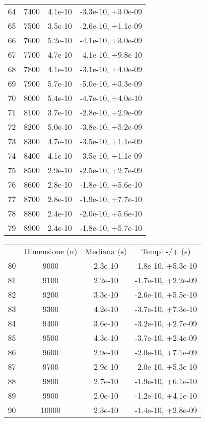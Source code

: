 \begin{table}
\begin{adjustbox}{width=1\textwidth/2}
\begin{tabular}{|c|c|c|c|}
\cline{1-4}
64 & 7400 & 4.1e-10 & -3.3e-10, +3.0e-09 \\
\cline{1-4}
65 & 7500 & 3.5e-10 & -2.6e-10, +1.1e-09 \\
\cline{1-4}
66 & 7600 & 5.2e-10 & -4.1e-10, +3.0e-09 \\
\cline{1-4}
67 & 7700 & 4.7e-10 & -4.1e-10, +9.8e-10 \\
\cline{1-4}
68 & 7800 & 4.1e-10 & -3.1e-10, +4.0e-09 \\
\cline{1-4}
69 & 7900 & 5.7e-10 & -5.0e-10, +3.3e-09 \\
\cline{1-4}
70 & 8000 & 5.4e-10 & -4.7e-10, +4.0e-10 \\
\cline{1-4}
71 & 8100 & 3.7e-10 & -2.8e-10, +2.9e-09 \\
\cline{1-4}
72 & 8200 & 5.0e-10 & -3.8e-10, +5.2e-09 \\
\cline{1-4}
73 & 8300 & 4.7e-10 & -3.5e-10, +1.1e-09 \\
\cline{1-4}
74 & 8400 & 4.1e-10 & -3.5e-10, +1.1e-09 \\
\cline{1-4}
75 & 8500 & 2.9e-10 & -2.5e-10, +2.7e-09 \\
\cline{1-4}
76 & 8600 & 2.8e-10 & -1.8e-10, +5.6e-10 \\
\cline{1-4}
77 & 8700 & 2.8e-10 & -1.9e-10, +7.7e-10 \\
\cline{1-4}
78 & 8800 & 2.4e-10 & -2.0e-10, +5.6e-10 \\
\cline{1-4}
79 & 8900 & 2.4e-10 & -1.8e-10, +5.7e-10 \\
\cline{1-4}
\end{tabular}
\end{adjustbox}
\end{table}

\begin{table}
\centering
\begin{adjustbox}{width=1\textwidth/2}
\begin{tabular}{|c|c|c|c|}
\hline
 & Dimensione (n) & Mediana (s) & Tempi -/+ (s) \\
80 & 9000 & 2.3e-10 & -1.8e-10, +5.3e-10 \\
\cline{1-4}
81 & 9100 & 2.2e-10 & -1.7e-10, +2.2e-09 \\
\cline{1-4}
82 & 9200 & 3.3e-10 & -2.6e-10, +5.5e-10 \\
\cline{1-4}
83 & 9300 & 4.2e-10 & -3.7e-10, +7.3e-10 \\
\cline{1-4}
84 & 9400 & 3.6e-10 & -3.2e-10, +2.7e-09 \\
\cline{1-4}
85 & 9500 & 4.3e-10 & -3.7e-10, +2.4e-09 \\
\cline{1-4}
86 & 9600 & 2.9e-10 & -2.0e-10, +7.1e-09 \\
\cline{1-4}
87 & 9700 & 2.9e-10 & -2.0e-10, +5.3e-10 \\
\cline{1-4}
88 & 9800 & 2.7e-10 & -1.9e-10, +6.1e-10 \\
\cline{1-4}
89 & 9900 & 2.0e-10 & -1.2e-10, +4.1e-10 \\
\cline{1-4}
90 & 10000 & 2.3e-10 & -1.4e-10, +2.8e-09 \\
\cline{1-4}
\end{tabular}
\end{adjustbox}
\end{table}
